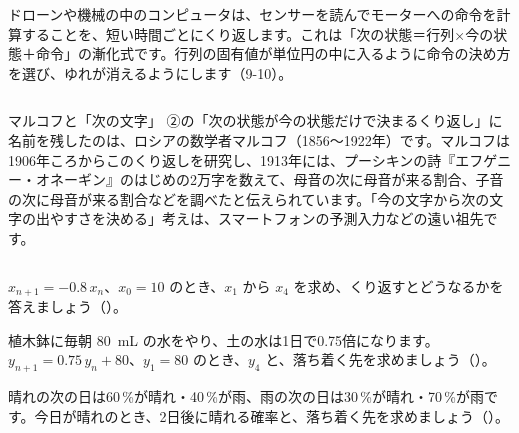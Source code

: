 \begin{butsuri}
\begin{itemize}[leftmargin=1.2\zw, itemsep=3pt, topsep=0pt, label={\color{bkPurple}●}]
\begin{minipage}[c]{0.74\linewidth}
ドローンや機械の中のコンピュータは、センサーを読んでモーターへの命令を計算することを、短い時間ごとにくり返します。これは「次の状態＝行列×今の状態＋命令」の漸化式です。行列の固有値が単位円の中に入るように命令の決め方を選び、ゆれが消えるようにします（9-10）。
\end{minipage}\hfill
\begin{minipage}[c]{0.22\linewidth}\centering
{}
\end{minipage}
\end{itemize}
\end{butsuri}

\begin{column}{マルコフと「次の文字」}
②の「次の状態が今の状態だけで決まるくり返し」に名前を残したのは、ロシアの数学者マルコフ（1856〜1922年）です。マルコフは1906年ころからこのくり返しを研究し、1913年には、プーシキンの詩『エフゲニー・オネーギン』のはじめの2万字を数えて、母音の次に母音が来る割合、子音の次に母音が来る割合などを調べたと伝えられています。「今の文字から次の文字の出やすさを決める」考えは、スマートフォンの予測入力などの遠い祖先です。
\end{column}

\bkendproblems
{}

\bkproblem $x_{n+1}=-0.8\,x_n$、$x_0=10$ のとき、$x_1$ から $x_4$ を求め、くり返すとどうなるかを答えましょう\mbox{（）}。

\bkproblem 植木鉢に毎朝 \qty{80}{mL} の水をやり、土の水は1日で0.75倍になります。$y_{n+1}=0.75\,y_n+80$、$y_1=80$ のとき、$y_4$ と、落ち着く先を求めましょう\mbox{（）}。

\bkproblem 晴れの次の日は60\,\%が晴れ・40\,\%が雨、雨の次の日は30\,\%が晴れ・70\,\%が雨です。今日が晴れのとき、2日後に晴れる確率と、落ち着く先を求めましょう\mbox{（）}。

